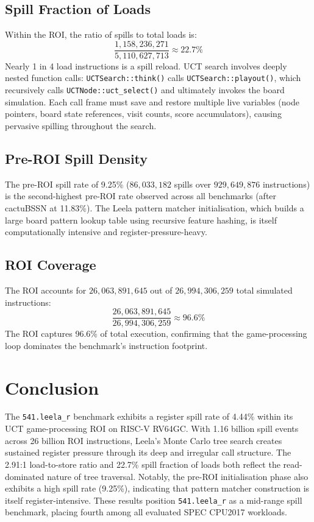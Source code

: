 \documentclass[conference]{IEEEtran}
\begin{document}
\subsection{Spill Fraction of Loads}

Within the ROI, the ratio of spills to total loads is:
\[
\frac{1{,}158{,}236{,}271}{5{,}110{,}627{,}713} \approx 22.7\%
\]
Nearly 1 in 4 load instructions is a spill reload. UCT search involves
deeply nested function calls: \texttt{UCTSearch::think()} calls
\texttt{UCTSearch::playout()}, which recursively calls
\texttt{UCTNode::uct\_select()} and ultimately invokes the board
simulation. Each call frame must save and restore multiple live
variables (node pointers, board state references, visit counts,
score accumulators), causing pervasive spilling throughout the search.

\subsection{Pre-ROI Spill Density}

The pre-ROI spill rate of 9.25\% ($86{,}033{,}182$ spills over
$929{,}649{,}876$ instructions) is the second-highest pre-ROI rate
observed across all benchmarks (after cactuBSSN at 11.83\%).
The Leela pattern matcher initialisation, which builds a large
board pattern lookup table using recursive feature hashing, is
itself computationally intensive and register-pressure-heavy.

\subsection{ROI Coverage}

The ROI accounts for $26{,}063{,}891{,}645$ out of
$26{,}994{,}306{,}259$ total simulated instructions:
\[
\frac{26{,}063{,}891{,}645}{26{,}994{,}306{,}259} \approx 96.6\%
\]
The ROI captures 96.6\% of total execution, confirming that the
game-processing loop dominates the benchmark's instruction footprint.

\section{Conclusion}

The \texttt{541.leela\_r} benchmark exhibits a register spill rate of
4.44\% within its UCT game-processing ROI on RISC-V RV64GC. With 1.16
billion spill events across 26 billion ROI instructions, Leela's
Monte Carlo tree search creates sustained register pressure through
its deep and irregular call structure. The 2.91:1 load-to-store ratio
and 22.7\% spill fraction of loads both reflect the read-dominated
nature of tree traversal. Notably, the pre-ROI initialisation phase
also exhibits a high spill rate (9.25\%), indicating that pattern
matcher construction is itself register-intensive. These results
position \texttt{541.leela\_r} as a mid-range spill benchmark, placing
fourth among all evaluated SPEC CPU2017 workloads.
\end{document}
